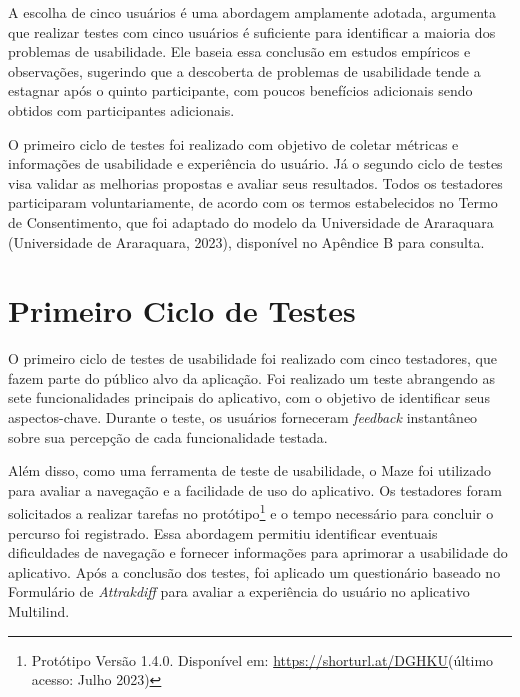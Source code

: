 A escolha de cinco usuários é uma abordagem amplamente adotada,  argumenta que realizar testes com cinco usuários é suficiente para identificar a maioria dos problemas de 
usabilidade. Ele baseia essa conclusão em estudos empíricos e observações, sugerindo que a descoberta de problemas de usabilidade tende a estagnar após o quinto participante, com poucos benefícios 
adicionais sendo obtidos com participantes adicionais.

O primeiro ciclo de testes foi realizado com objetivo de coletar métricas e informações de usabilidade e experiência do usuário. Já o segundo ciclo de testes visa validar as melhorias propostas e 
avaliar seus resultados. Todos os testadores participaram voluntariamente, de acordo com os termos estabelecidos no Termo de Consentimento, que foi adaptado do 
modelo da Universidade de Araraquara (Universidade de Araraquara, 2023), disponível no Apêndice B para consulta.
 
\section{Primeiro Ciclo de Testes}
\label{sec:Primeiro Ciclo}
O primeiro ciclo de testes de usabilidade foi realizado com cinco testadores, que fazem parte do público alvo da aplicação. Foi realizado um teste abrangendo as sete funcionalidades 
principais do aplicativo, com o objetivo de identificar seus aspectos-chave. Durante o teste, os usuários forneceram \textit{feedback} instantâneo sobre sua percepção de cada funcionalidade testada. 

Além disso, como uma ferramenta de teste de usabilidade, o Maze foi utilizado para avaliar a navegação e a facilidade de uso do aplicativo. Os testadores foram solicitados a realizar  
tarefas no protótipo\footnote{Protótipo Versão 1.4.0. Disponível em: \url{https://shorturl.at/DGHKU}(último acesso: Julho 2023)} 
e o tempo necessário para concluir o percurso foi registrado. Essa abordagem permitiu identificar eventuais dificuldades de navegação e fornecer informações para aprimorar a usabilidade do aplicativo. Após a conclusão dos 
testes, foi aplicado um questionário baseado no Formulário de \textit{Attrakdiff} para avaliar a experiência do usuário no aplicativo Multilind.

